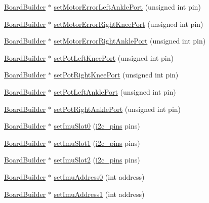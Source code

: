 \begin{DoxyCompactItemize}
\hyperlink{classBoardBuilder}{Board\+Builder} $\ast$ \hyperlink{classBoardBuilder_a67ca4bf0ff9dd47ad41167f28609198d}{set\+Motor\+Error\+Left\+Ankle\+Port} (unsigned int pin)
\item 
\hyperlink{classBoardBuilder}{Board\+Builder} $\ast$ \hyperlink{classBoardBuilder_af1844bf3c23c234d383e7088aeae4586}{set\+Motor\+Error\+Right\+Knee\+Port} (unsigned int pin)
\item 
\hyperlink{classBoardBuilder}{Board\+Builder} $\ast$ \hyperlink{classBoardBuilder_a19172172dec1ebd8ca6f55da714e8432}{set\+Motor\+Error\+Right\+Ankle\+Port} (unsigned int pin)
\item 
\hyperlink{classBoardBuilder}{Board\+Builder} $\ast$ \hyperlink{classBoardBuilder_a84a89241c8c3e5de3eb57f61e5a72260}{set\+Pot\+Left\+Knee\+Port} (unsigned int pin)
\item 
\hyperlink{classBoardBuilder}{Board\+Builder} $\ast$ \hyperlink{classBoardBuilder_a6cefb78d7133e0a9e02794fe8a952418}{set\+Pot\+Right\+Knee\+Port} (unsigned int pin)
\item 
\hyperlink{classBoardBuilder}{Board\+Builder} $\ast$ \hyperlink{classBoardBuilder_a462070b794a9e1936f7b6343376fc1dd}{set\+Pot\+Left\+Ankle\+Port} (unsigned int pin)
\item 
\hyperlink{classBoardBuilder}{Board\+Builder} $\ast$ \hyperlink{classBoardBuilder_a46e5913604d6a4bed3213edc32dfc086}{set\+Pot\+Right\+Ankle\+Port} (unsigned int pin)
\item 
\hyperlink{classBoardBuilder}{Board\+Builder} $\ast$ \hyperlink{classBoardBuilder_a605bdcd8ab4345a95e5cce7572e502d9}{set\+Imu\+Slot0} (\hyperlink{Arduino_8hpp_aaa5bce2cb83fc43fec67214bf4feea69}{i2c\+\_\+pins} pins)
\item 
\hyperlink{classBoardBuilder}{Board\+Builder} $\ast$ \hyperlink{classBoardBuilder_a81a2989c618778f27074eb09f2f795dc}{set\+Imu\+Slot1} (\hyperlink{Arduino_8hpp_aaa5bce2cb83fc43fec67214bf4feea69}{i2c\+\_\+pins} pins)
\item 
\hyperlink{classBoardBuilder}{Board\+Builder} $\ast$ \hyperlink{classBoardBuilder_a7f46c63a3ecc231e1848ad48e305866c}{set\+Imu\+Slot2} (\hyperlink{Arduino_8hpp_aaa5bce2cb83fc43fec67214bf4feea69}{i2c\+\_\+pins} pins)
\item 
\hyperlink{classBoardBuilder}{Board\+Builder} $\ast$ \hyperlink{classBoardBuilder_ab2bebea64ab23e10e4e4c4cce1c6fbe6}{set\+Imu\+Address0} (int address)
\item 
\hyperlink{classBoardBuilder}{Board\+Builder} $\ast$ \hyperlink{classBoardBuilder_afa1f42f0422db548ebde9aab55e50e1d}{set\+Imu\+Address1} (int address)
\end{DoxyCompactItemize}


